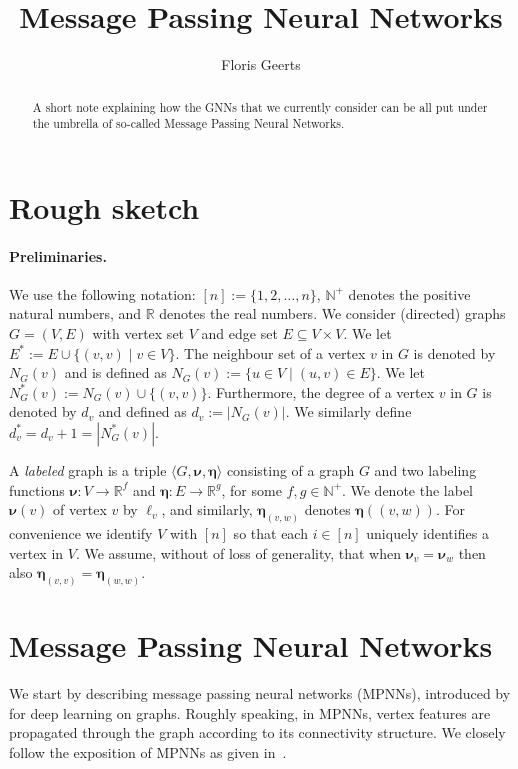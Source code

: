 \documentclass[10pt,a4paper]{article}
\title{Message Passing Neural Networks}
\author{Floris Geerts}
\theoremstyle{definition}
\begin{document}
\maketitle
\begin{abstract}
	A short note explaining how the GNNs that we currently consider
	can be all put under the umbrella of so-called Message Passing Neural
	Networks.
\end{abstract}


\section{Rough sketch}
\paragraph{Preliminaries.}
We use the following notation: $[n]:=\{1,2,\ldots,n\}$, $\mathbb{N}^+$ denotes the positive natural numbers, and $\mathbb{R}$ denotes the real numbers. We consider (directed) graphs $G=(V,E)$ with vertex set $V$ and edge set $E\subseteq V\times V$. 
We let $E^*:=E\cup \{(v,v)\mid v\in V\}$. The neighbour set of a vertex $v$ in $G$ is denoted by $N_G(v)$ and is defined as $N_G(v):=\{u\in V\mid (u,v)\in E\}$. We let $N_G^*(v):=N_G(v)\cup \{(v,v)\}$. Furthermore, the degree of a vertex $v$ in $G$ is denoted by 
$d_v$ and defined as $d_v:=|N_G(v)|$. We similarly define $d_v^*=d_v+1=|N_G^*(v)|$.

A \textit{labeled} graph is a triple  $\langle G,\pmb{\nu},\pmb{\eta}\rangle$ consisting of a graph $G$ and two labeling functions 
$\pmb{\nu}:V\to\mathbb{R}^{f}$ and
$\pmb{\eta}:E\to \mathbb{R}^{g}$, for some $f,g\in\mathbb{N}^+$.  We denote the label
$\pmb{\nu}(v)$ of vertex $v$ by $\pmb{\ell}_v$, and similarly, $\pmb{\eta}_{(v,w)}$ denotes
$\pmb{\eta}((v,w))$. For convenience we identify $V$ with $[n]$ so that each $i\in [n]$ uniquely identifies a vertex in $V$. We assume, without of loss of generality, that when $\pmb{\nu}_v=\pmb{\nu}_w$ then also $\pmb{\eta}_{(v,v)}=\pmb{\eta}_{(w,w)}$. 


\section{Message Passing Neural Networks}
We start by describing message passing neural networks (MPNNs), introduced by \citet{GilmerSRVD17} for deep learning on graphs. Roughly speaking, in MPNNs, vertex features are propagated through the graph according to its connectivity structure. We closely follow the exposition of MPNNs as given in~\citep{Loukas2019}. 
\end{document}
